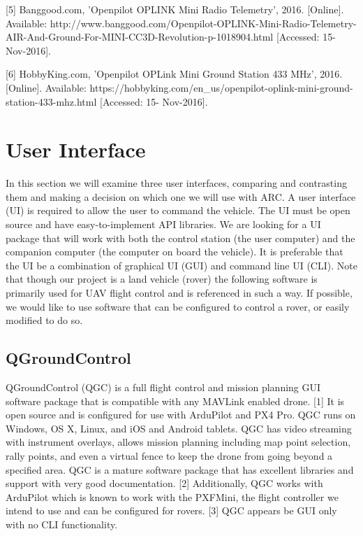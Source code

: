 \documentclass[compsoc,draftclsnofoot,onecolumn,10pt]{IEEEtran}
\begin{document}
[5] Banggood.com, 'Openpilot OPLINK Mini Radio Telemetry', 2016. [Online].
Available: http://www.banggood.com/Openpilot-OPLINK-Mini-Radio-Telemetry-AIR-And-Ground-For-MINI-CC3D-Revolution-p-1018904.html [Accessed: 15- Nov-2016].\par

[6] HobbyKing.com, 'Openpilot OPLink Mini Ground Station 433 MHz', 2016.  [Online]. Available: https://hobbyking.com/en\_us/openpilot-oplink-mini-ground-station-433-mhz.html [Accessed: 15- Nov-2016].\par

\newpage

\section{User Interface}
In this section we will examine three user interfaces, comparing and contrasting
them and making a decision on which one we will use with ARC.
A user interface (UI) is required to allow the user to command the vehicle. The
UI must be open source and have easy-to-implement API libraries. We are looking
for a UI package that will work with both the control station (the user
computer) and the companion computer (the computer on board the vehicle). It is
preferable that the UI be a combination of graphical UI (GUI) and command line
UI (CLI). Note that though our project is a land vehicle (rover) the following
software is primarily used for UAV flight control and is referenced in such a
way. If possible, we would like to use software that can be configured to
control a rover, or easily modified to do so.

\subsection{QGroundControl}

QGroundControl (QGC) is a full flight control and mission planning GUI software
package that is compatible with any MAVLink enabled drone. [1] It is open source and
is configured for use with ArduPilot and PX4 Pro. QGC runs on Windows, OS X,
Linux, and iOS and Android tablets. QGC has video streaming with instrument
overlays, allows mission planning including map point selection, rally points,
and even a virtual fence to keep the drone from going beyond a specified area.
QGC is a mature software package that has excellent libraries and support with
very good documentation. [2]
Additionally, QGC works with ArduPilot which is known to work with the PXFMini,
the flight controller we intend to use and can be configured for rovers. [3] QGC 
appears be GUI only with no CLI functionality.
\end{document}
